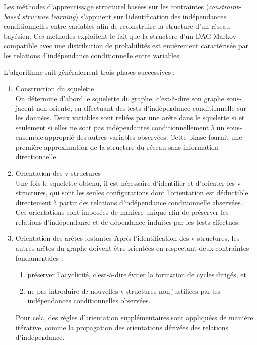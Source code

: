 \documentclass{article}
\begin{document}
Les méthodes d'apprentissage structurel basées sur les contraintes (\textit{constraint-based structure learning}) s'appuient sur
l'identification des indépendances conditionnelles entre variables afin de reconstruire la structure d'un réseau bayésien.
Ces méthodes exploitent le fait que la structure d'un DAG Markov-compatible avec une distribution de probabilités est
entièrement caractérisée par les relations d'indépendance conditionnelle entre variables.

L'algorithme suit généralement trois phases successives :

\begin{enumerate}
    \item Construction du squelette \\
          On détermine d'abord le squelette du graphe, c'est-à-dire son graphe sous-jacent non orienté,
          en effectuant des tests d'indépendance conditionnelle sur les données. Deux variables sont
          reliées par une arête dans le squelette si et seulement si elles ne sont pas indépendantes
          conditionnellement à un sous-ensemble approprié des autres variables observées. Cette phase
          fournit une première approximation de la structure du réseau sans information directionnelle.

    \item Orientation des v-structures\\
          Une fois le squelette obtenu, il est nécessaire d'identifier et d'orienter les v-structures,
          qui sont les seules configurations dont l'orientation est déductible directement à partir des
          relations d'indépendance conditionnelle observées. Ces orientations sont imposées de manière
          unique afin de préserver les relations d'indépendance et de dépendance induites par les tests effectués.

    \item Orientation des arêtes restantes
          Après l'identification des v-structures, les autres arêtes du graphe doivent être orientées en respectant
          deux contraintes fondamentales :
          \begin{enumerate}[label=(\roman*)]
              \item préserver l'acyclicité, c'est-à-dire éviter la formation de cycles dirigés, et
              \item ne pas introduire de nouvelles v-structures non justifiées par les indépendances conditionnelles observées.
          \end{enumerate}

          Pour cela, des règles d'orientation supplémentaires sont appliquées de manière itérative, comme la propagation des
          orientations dérivées des relations d'indépendance.
\end{enumerate}
\end{document}
